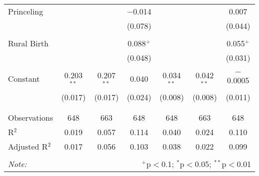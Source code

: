 \documentclass[12pt,letterpaper]{article}
\begin{document}
\begin{table}[!htbp]
\begin{tabular}{@{\extracolsep{5pt}}lcccccc}
		Princeling &  &  & $-$0.014 &  &  & 0.007 \\ 
		&  &  & (0.078) &  &  & (0.044) \\ 
		& & & & & & \\ 
		Rural Birth &  &  & 0.088$^{+}$ &  &  & 0.055$^{+}$ \\ 
		&  &  & (0.048) &  &  & (0.031) \\ 
		& & & & & & \\ 
		Constant & 0.203$^{**}$ & 0.207$^{**}$ & 0.040 & 0.034$^{**}$ & 0.042$^{**}$ & $-$0.0005 \\ 
		& (0.017) & (0.017) & (0.024) & (0.008) & (0.008) & (0.011) \\ 
		& & & & & & \\ 
		\hline \\[-1.8ex] 
		Observations & 648 & 663 & 648 & 648 & 663 & 648 \\ 
		R$^{2}$ & 0.019 & 0.057 & 0.114 & 0.040 & 0.024 & 0.110 \\ 
		Adjusted R$^{2}$ & 0.017 & 0.056 & 0.103 & 0.038 & 0.022 & 0.099 \\ 
		\hline 
		\hline \\[-1.8ex] 
		\textit{Note:}  & \multicolumn{6}{r}{$^{+}$p$<$0.1; $^{*}$p$<$0.05; $^{**}$p$<$0.01}} \\ 
\end{tabular} 
\end{table} 
\end{document}
